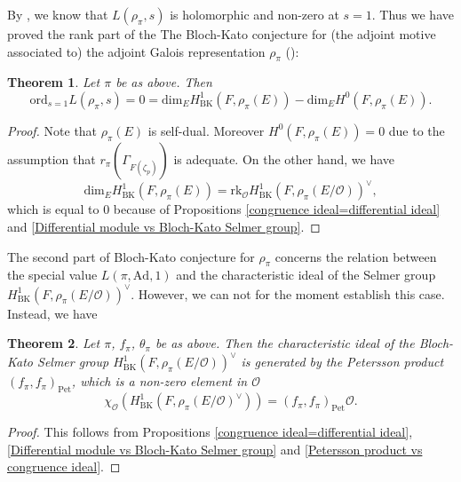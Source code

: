 \documentclass[12pt,oneside,reqno]{amsart}
\theoremstyle{plain}
\newtheorem{theorem}{Theorem}[section]
\begin{document}
	
	
	
	
	
	
	
	
	
	By \cite[Theorem 1.5.3(a)]{Arthur2013}, we know that $L(\rho_\pi,s)$ is holomorphic and non-zero at $s=1$. Thus we have proved the rank part of the The Bloch-Kato conjecture for (the adjoint motive associated to) the adjoint Galois representation $\rho_\pi$ (\cite{BlochKato1990}):
	\begin{theorem}\label{Bloch-Kato, rank part}
		Let $\pi$ be as above. Then
		\[
		\mathrm{ord}_{s=1}L(\rho_\pi,s)
		=0
		=
		\mathrm{dim}_EH^1_\mathrm{BK}(F,\rho_\pi(E))
		-
		\mathrm{dim}_EH^0(F,\rho_\pi(E)).		
		\]
	\end{theorem}
	\begin{proof}
		Note that $\rho_\pi(E)$ is self-dual. Moreover $H^0(F,\rho_\pi(E))=0$ due to the assumption that $r_\pi(\Gamma_{F(\zeta_p)})$ is adequate. On the other hand, we have
		\[
		\mathrm{dim}_EH^1_\mathrm{BK}(F,\rho_\pi(E))
		=
		\mathrm{rk}_\mathcal{O}H^1_\mathrm{BK}(F,\rho_\pi(E/\mathcal{O}))^\vee,
		\]
		which is equal to 0 because of Propositions \ref{congruence ideal=differential ideal} and \ref{Differential module vs Bloch-Kato Selmer group}.
	\end{proof}
	
	
	
	The second part of Bloch-Kato conjecture for $\rho_\pi$ concerns the relation between the special value $L(\pi,\mathrm{Ad},1)$ and the characteristic ideal of the Selmer group $H^1_\mathrm{BK}(F,\rho_\pi(E/\mathcal{O}))^\vee$. However, we can not for the moment establish this case. Instead, we have
	\begin{theorem}\label{Bloch-Kato, special value part}
		Let $\pi$, $f_\pi$, $\theta_\pi$ be as above. Then the characteristic ideal of the Bloch-Kato Selmer group $H^1_\mathrm{BK}(F,\rho_\pi(E/\mathcal{O}))^\vee$ is generated by the Petersson product $(f_\pi,f_\pi)_\mathrm{Pet}$, which is a non-zero element in $\mathcal{O}$
		\[
		\chi_{\mathcal{O}}(H^1_\mathrm{BK}(F,\rho_\pi(E/\mathcal{O})^\vee))
		=
		(f_\pi,f_\pi)_\mathrm{Pet}\mathcal{O}.
		\]
	\end{theorem}
	\begin{proof}
		This follows from Propositions \ref{congruence ideal=differential ideal},  \ref{Differential module vs Bloch-Kato Selmer group} and \ref{Petersson product vs congruence ideal}.
	\end{proof}
	
	
	
\end{document}
